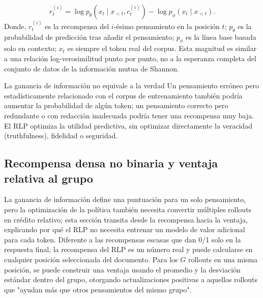 
\[
r_t^{(i)}
=\log p_\theta(x_t\mid x_{<t},c_t^{(i)})
-\log p_\phi(x_t\mid x_{<t}).
\]
Donde, $r_t^{(i)}$ es la recompensa del $i$-ésimo pensamiento en la posición $t$; $p_\theta$ es la probabilidad de predicción tras añadir el pensamiento; $p_\phi$ es la línea base basada solo en contexto; $x_t$ es siempre el token real del corpus. Esta magnitud es similar a una relación log-verosimilitud punto por punto, no a la esperanza completa del conjunto de datos de la información mutua de Shannon.


\begin{warningbox}{La ganancia de información no equivale a la verdad}
Un pensamiento erróneo pero estadísticamente relacionado con el corpus de entrenamiento también podría aumentar la probabilidad de algún token; un pensamiento correcto pero redundante o con redacción inadecuada podría tener una recompensa muy baja. El RLP optimiza la utilidad predictiva, sin optimizar directamente la veracidad (truthfulness), fidelidad o seguridad.
\end{warningbox}

\subsection{Recompensa densa no binaria y ventaja relativa al grupo}

La ganancia de información define una puntuación para un solo pensamiento, pero la optimización de la política también necesita convertir múltiples rollouts en crédito relativo; esta sección transita desde la recompensa hacia la ventaja, explicando por qué el RLP no necesita entrenar un modelo de valor adicional para cada token. Diferente a las recompensas escasas que dan 0/1 solo en la respuesta final, la recompensa del RLP es un número real y puede calcularse en cualquier posición seleccionada del documento. Para los $G$ rollouts en una misma posición, se puede construir una ventaja usando el promedio y la desviación estándar dentro del grupo, otorgando actualizaciones positivas a aquellos rollouts que "ayudan más que otros pensamientos del mismo grupo".

